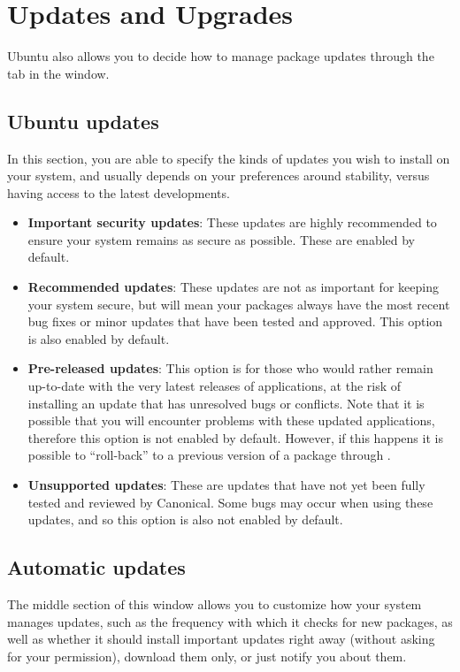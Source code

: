 \section{Updates and Upgrades}

Ubuntu also allows you to decide how to manage package updates through the  tab in the  window.

\subsection{Ubuntu updates}

In this section, you are able to specify the kinds of updates you wish to install on your system, and usually depends on your preferences around stability, versus having access to the latest developments. 

\begin{itemize}
	\item \textbf{Important security updates}: These updates are highly recommended to ensure your system remains as secure as possible. These are enabled by default.
	\item \textbf{Recommended updates}: These updates are not as important for keeping your system secure, but will mean your packages always have the most recent bug fixes or minor updates that have been tested and approved. This option is also enabled by default.
	\item \textbf{Pre-released updates}: This option is for those who would rather remain up-to-date with the very latest releases of applications, at the risk of installing an update that has unresolved bugs or conflicts. Note that it is possible that you will encounter problems with these updated applications, therefore this option is not enabled by default. However, if this happens it is possible to ``roll-back'' to a previous version of a package through .
	\item \textbf{Unsupported updates}: These are updates that have not yet been fully tested and reviewed by Canonical. Some bugs may occur when using these updates, and so this option is also not enabled by default.
\end{itemize}

\subsection{Automatic updates}
The middle section of this window allows you to customize how your system manages updates, such as the frequency with which it checks for new packages, as well as whether it should install important updates right away (without asking for your permission), download them only, or just notify you about them.

